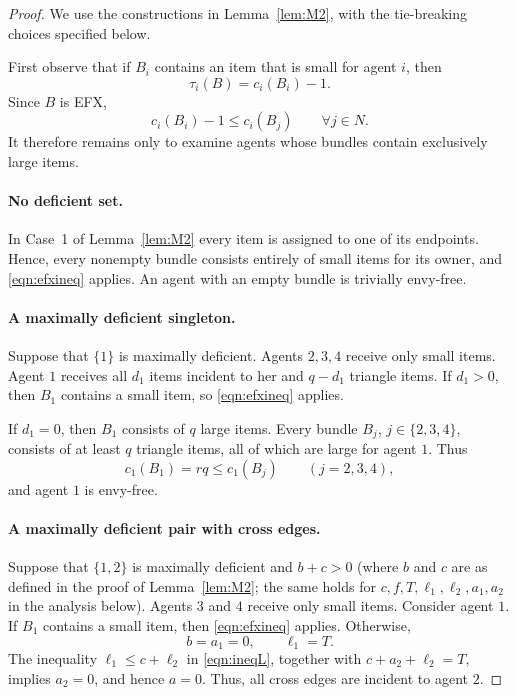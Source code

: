 \documentclass{article}
\theoremstyle{definition}
\begin{document}
\begin{proof}
We use the constructions in Lemma~\ref{lem:M2}, with the tie-breaking choices specified
below.

First observe that if $B_i$ contains an item that is small for agent $i$,
then
\[
 \tau_i(B)=c_i(B_i)-1.
\]
Since $B$ is EFX,
\begin{equation}\label{eqn:efxineq}
     c_i(B_i)-1\le c_i(B_j)\qquad\forall j\in N.
\end{equation}
It therefore remains only to examine agents whose bundles contain exclusively
large items.

\paragraph{No deficient set.}
In Case~1 of Lemma~\ref{lem:M2} every item is assigned to one of its endpoints.  Hence,
every nonempty bundle consists entirely of small items for its owner, and
\eqref{eqn:efxineq} applies.  An agent with an empty bundle is trivially
envy-free.

\paragraph{A maximally deficient singleton.}
Suppose that $\{1\}$ is maximally deficient.  Agents $2,3,4$ receive only
small items.  Agent $1$ receives all $d_1$ items incident to her and
$q-d_1$ triangle items.  If $d_1>0$, then $B_1$ contains a small item, so
\eqref{eqn:efxineq} applies.

If $d_1=0$, then $B_1$ consists of $q$ large items.  Every bundle
$B_j$, $j\in\{2,3,4\}$, consists of at least $q$ triangle items, all of
which are large for agent $1$.  Thus
\[
 c_1(B_1)=rq\le c_1(B_j)\qquad(j=2,3,4),
\]
and agent $1$ is envy-free.

\paragraph{A maximally deficient pair with cross edges.}
Suppose that $\{1,2\}$ is maximally deficient and $b+c>0$ (where $b$ and $c$ are as defined in the proof of Lemma~\ref{lem:M2}; the same holds for $c,f,T,\ell_1,\ell_2,a_1,a_2$ in the analysis below).  Agents $3$ and
$4$ receive only small items.  Consider agent $1$.  If $B_1$ contains a
small item, then \eqref{eqn:efxineq} applies.  Otherwise,
\[
 b=a_1=0,\qquad \ell_1=T.
\]
The inequality $\ell_1\le c+\ell_2$ in \eqref{eqn:ineqL}, together with
$c+a_2+\ell_2=T$, implies $a_2=0$, and hence $a=0$.  Thus, all cross edges
are incident to agent $2$.


\end{proof}
\end{document}
